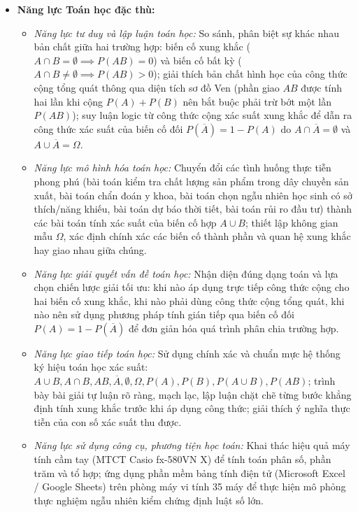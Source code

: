 \documentclass[12pt, a4paper]{article}
\begin{document}
\begin{itemize}[leftmargin=1.2cm]
    \item \textbf{Năng lực Toán học đặc thù:}
    \begin{itemize}[leftmargin=0.6cm]
        \item \textit{Năng lực tư duy và lập luận toán học:} So sánh, phân biệt sự khác nhau bản chất giữa hai trường hợp: biến cố xung khắc ($A \cap B = \emptyset \implies P(AB) = 0$) và biến cố bất kỳ ($A \cap B \neq \emptyset \implies P(AB) > 0$); giải thích bản chất hình học của công thức cộng tổng quát thông qua diện tích sơ đồ Ven (phần giao $AB$ được tính hai lần khi cộng $P(A) + P(B)$ nên bắt buộc phải trừ bớt một lần $P(AB)$); suy luận logic từ công thức cộng xác suất xung khắc để dẫn ra công thức xác suất của biến cố đối $P(\overline{A}) = 1 - P(A)$ do $A \cap \overline{A} = \emptyset$ và $A \cup \overline{A} = \Omega$.
        \item \textit{Năng lực mô hình hóa toán học:} Chuyển đổi các tình huống thực tiễn phong phú (bài toán kiểm tra chất lượng sản phẩm trong dây chuyền sản xuất, bài toán chẩn đoán y khoa, bài toán chọn ngẫu nhiên học sinh có sở thích/năng khiếu, bài toán dự báo thời tiết, bài toán rủi ro đầu tư) thành các bài toán tính xác suất của biến cố hợp $A \cup B$; thiết lập không gian mẫu $\Omega$, xác định chính xác các biến cố thành phần và quan hệ xung khắc hay giao nhau giữa chúng.
        \item \textit{Năng lực giải quyết vấn đề toán học:} Nhận diện đúng dạng toán và lựa chọn chiến lược giải tối ưu: khi nào áp dụng trực tiếp công thức cộng cho hai biến cố xung khắc, khi nào phải dùng công thức cộng tổng quát, khi nào nên sử dụng phương pháp tính gián tiếp qua biến cố đối $P(A) = 1 - P(\overline{A})$ để đơn giản hóa quá trình phân chia trường hợp.
        \item \textit{Năng lực giao tiếp toán học:} Sử dụng chính xác và chuẩn mực hệ thống ký hiệu toán học xác suất: $A \cup B, A \cap B, AB, \overline{A}, \emptyset, \Omega, P(A), P(B), P(A \cup B), P(AB)$; trình bày bài giải tự luận rõ ràng, mạch lạc, lập luận chặt chẽ từng bước khẳng định tính xung khắc trước khi áp dụng công thức; giải thích ý nghĩa thực tiễn của con số xác suất thu được.
        \item \textit{Năng lực sử dụng công cụ, phương tiện học toán:} Khai thác hiệu quả máy tính cầm tay (MTCT Casio fx-580VN X) để tính toán phân số, phần trăm và tổ hợp; ứng dụng phần mềm bảng tính điện tử (Microsoft Excel / Google Sheets) trên phòng máy vi tính 35 máy để thực hiện mô phỏng thực nghiệm ngẫu nhiên kiểm chứng định luật số lớn.
    \end{itemize}


\end{itemize}
\end{document}
